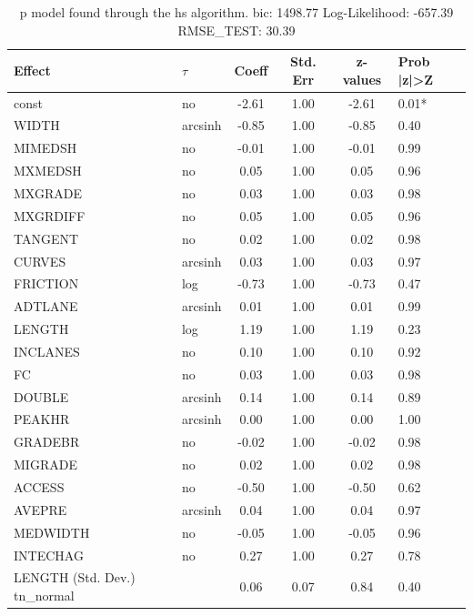 \begin{table}
	\caption{p model found through the hs algorithm. bic: 1498.77 Log-Likelihood: -657.39 RMSE_TEST: 30.39}
	\begin{center}
		\begin{tabular}{|l|l|c|c|c|l|}
			\hline
			Effect & $\tau$ & Coeff & Std. Err & z-values & Prob |z|>Z \\
			\hline
			const & no & -2.61 & 1.00 & -2.61 & 0.01* \\
			\hline
			WIDTH & arcsinh & -0.85 & 1.00 & -0.85 & 0.40 \\
			\hline
			MIMEDSH & no & -0.01 & 1.00 & -0.01 & 0.99 \\
			\hline
			MXMEDSH & no & 0.05 & 1.00 & 0.05 & 0.96 \\
			\hline
			MXGRADE & no & 0.03 & 1.00 & 0.03 & 0.98 \\
			\hline
			MXGRDIFF & no & 0.05 & 1.00 & 0.05 & 0.96 \\
			\hline
			TANGENT & no & 0.02 & 1.00 & 0.02 & 0.98 \\
			\hline
			CURVES & arcsinh & 0.03 & 1.00 & 0.03 & 0.97 \\
			\hline
			FRICTION & log & -0.73 & 1.00 & -0.73 & 0.47 \\
			\hline
			ADTLANE & arcsinh & 0.01 & 1.00 & 0.01 & 0.99 \\
			\hline
			LENGTH & log & 1.19 & 1.00 & 1.19 & 0.23 \\
			\hline
			INCLANES & no & 0.10 & 1.00 & 0.10 & 0.92 \\
			\hline
			FC & no & 0.03 & 1.00 & 0.03 & 0.98 \\
			\hline
			DOUBLE & arcsinh & 0.14 & 1.00 & 0.14 & 0.89 \\
			\hline
			PEAKHR & arcsinh & 0.00 & 1.00 & 0.00 & 1.00 \\
			\hline
			GRADEBR & no & -0.02 & 1.00 & -0.02 & 0.98 \\
			\hline
			MIGRADE & no & 0.02 & 1.00 & 0.02 & 0.98 \\
			\hline
			ACCESS & no & -0.50 & 1.00 & -0.50 & 0.62 \\
			\hline
			AVEPRE & arcsinh & 0.04 & 1.00 & 0.04 & 0.97 \\
			\hline
			MEDWIDTH & no & -0.05 & 1.00 & -0.05 & 0.96 \\
			\hline
			INTECHAG & no & 0.27 & 1.00 & 0.27 & 0.78 \\
			\hline
			LENGTH (Std. Dev.) tn_normal &  & 0.06 & 0.07 & 0.84 & 0.40 \\
			\hline

\end{tabular}
\end{center}
\end{table}
